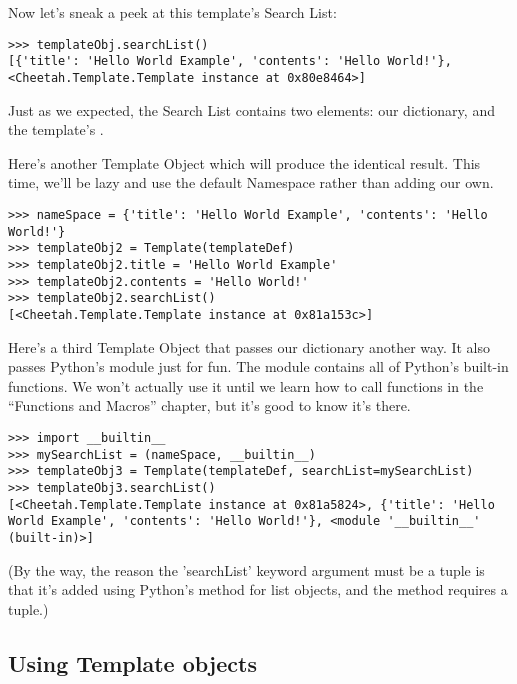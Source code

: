 Now let's sneak a peek at this template's Search List:

\begin{verbatim}
>>> templateObj.searchList()
[{'title': 'Hello World Example', 'contents': 'Hello World!'}, 
<Cheetah.Template.Template instance at 0x80e8464>]
\end{verbatim}

Just as we expected, the Search List contains two elements: our 
 dictionary, and the template's .

Here's another Template Object which will produce the identical result.
This time, we'll be lazy and use the default Namespace rather than adding our
own.

\begin{verbatim}
>>> nameSpace = {'title': 'Hello World Example', 'contents': 'Hello World!'}
>>> templateObj2 = Template(templateDef)
>>> templateObj2.title = 'Hello World Example'
>>> templateObj2.contents = 'Hello World!'
>>> templateObj2.searchList()
[<Cheetah.Template.Template instance at 0x81a153c>]
\end{verbatim}

Here's a third Template Object that passes our  dictionary
another way.  It also passes Python's  module just for
fun.  The  module contains all of Python's built-in
functions.  We won't actually use it until we learn how to call functions in
the ``Functions and Macros'' chapter, but it's good to know it's there.

\begin{verbatim}
>>> import __builtin__
>>> mySearchList = (nameSpace, __builtin__)
>>> templateObj3 = Template(templateDef, searchList=mySearchList)
>>> templateObj3.searchList()
[<Cheetah.Template.Template instance at 0x81a5824>, {'title': 'Hello World Example', 'contents': 'Hello World!'}, <module '__builtin__' (built-in)>]
\end{verbatim}

(By the way, the reason the 'searchList' keyword argument must be a tuple is
that it's added using Python's  method for list objects, and
the  method requires a tuple.)



\subsection{Using Template objects}

